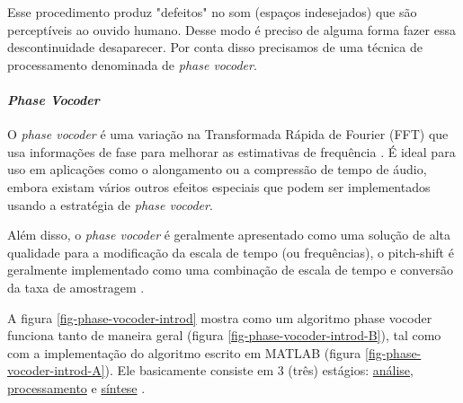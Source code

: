 				Esse procedimento produz "defeitos" no som (espaços indesejados) que são perceptíveis ao ouvido humano. Desse modo é preciso de alguma forma fazer essa descontinuidade desaparecer. Por conta disso precisamos de uma técnica de processamento denominada de \textit{phase vocoder}.
				
			\paragraph{\textit{Phase Vocoder}}
				\label{parafrafo-phase-vocoder}
				
				O \textit{phase vocoder} é uma variação na Transformada Rápida de Fourier (FFT) que usa informações de fase para melhorar as estimativas de frequência \cite{Sethares}. É ideal para uso em aplicações como o alongamento  ou a compressão de tempo de áudio, embora existam vários outros efeitos especiais que podem ser implementados usando a estratégia de \textit{phase vocoder}.
				
				Além disso, o \textit{phase vocoder} é geralmente apresentado como uma solução de alta qualidade para a modificação da escala de tempo (ou frequências), o pitch-shift é geralmente implementado como uma combinação de escala de tempo e conversão da taxa de amostragem \cite{Laroche1999}.
				
				A figura \ref{fig-phase-vocoder-introd} mostra como um algoritmo phase vocoder funciona tanto de maneira geral (figura \ref{fig-phase-vocoder-introd-B}), tal como com a implementação do algoritmo escrito em MATLAB (figura \ref{fig-phase-vocoder-introd-A}). Ele basicamente consiste em 3 (três) estágios: \underline{análise}, \underline{processamento} e \underline{síntese} \cite{Portnoff1976}. 
				
